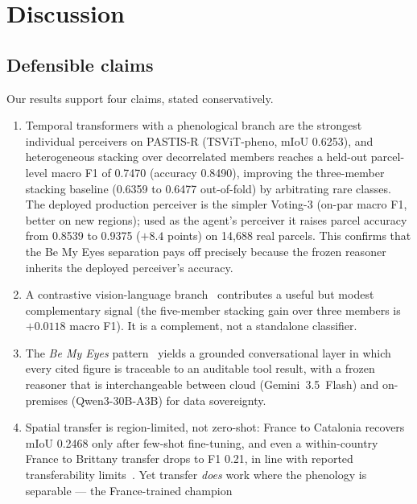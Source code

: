 \section{Discussion}
\label{sec:discussion}

\subsection{Defensible claims}
Our results support four claims, stated conservatively.
\begin{enumerate}[leftmargin=*]
    \item Temporal transformers with a phenological branch are the
    strongest individual perceivers on PASTIS-R (TSViT-pheno, mIoU
    0.6253), and heterogeneous stacking over decorrelated members
    reaches a held-out parcel-level macro F1 of 0.7470
    (accuracy 0.8490), improving the three-member stacking baseline
    (0.6359 to 0.6477 out-of-fold) by arbitrating rare classes. The
    deployed production perceiver is the simpler Voting-3 (on-par macro
    F1, better on new regions); used as the agent's perceiver it raises
    parcel accuracy from 0.8539 to 0.9375 ($+8.4$ points) on 14{,}688 real
    parcels. This confirms that the Be My Eyes separation pays off
    precisely because the frozen reasoner inherits the deployed
    perceiver's accuracy.
    \item A contrastive vision-language branch~\cite{li2025farslip}
    contributes a useful but modest complementary signal (the
    five-member stacking gain over three members is $+0.0118$ macro
    F1). It is a complement, not a standalone classifier.
    \item The \emph{Be My Eyes} pattern~\cite{huang2025bemyeyes} yields
    a grounded conversational layer in which every cited figure is
    traceable to an auditable tool result, with a frozen reasoner that
    is interchangeable between cloud (Gemini~3.5~Flash) and on-premises
    (Qwen3-30B-A3B) for data sovereignty.
    \item Spatial transfer is region-limited, not zero-shot: France to
    Catalonia recovers mIoU 0.2468 only after few-shot fine-tuning, and
    even a within-country France to Brittany transfer drops to F1 0.21,
    in line with reported transferability
    limits~\cite{harvesting2026alphaearth}. Yet transfer \emph{does}
    work where the phenology is separable --- the France-trained champion

\end{enumerate}

